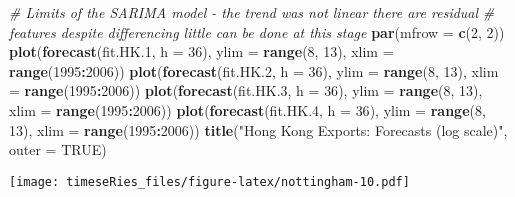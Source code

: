 \documentclass[]{book}
\newenvironment{Shaded}{\begin{snugshade}}{\end{snugshade}}
\newcommand{\CommentTok}[1]{\textcolor[rgb]{0.56,0.35,0.01}{\textit{#1}}}
\newcommand{\DataTypeTok}[1]{\textcolor[rgb]{0.13,0.29,0.53}{#1}}
\newcommand{\DecValTok}[1]{\textcolor[rgb]{0.00,0.00,0.81}{#1}}
\newcommand{\FloatTok}[1]{\textcolor[rgb]{0.00,0.00,0.81}{#1}}
\newcommand{\KeywordTok}[1]{\textcolor[rgb]{0.13,0.29,0.53}{\textbf{#1}}}
\newcommand{\NormalTok}[1]{#1}
\newcommand{\OperatorTok}[1]{\textcolor[rgb]{0.81,0.36,0.00}{\textbf{#1}}}
\newcommand{\OtherTok}[1]{\textcolor[rgb]{0.56,0.35,0.01}{#1}}
\newcommand{\StringTok}[1]{\textcolor[rgb]{0.31,0.60,0.02}{#1}}
\begin{document}
\begin{Shaded}
\begin{Highlighting}[]
\CommentTok{# Limits of the SARIMA model - the trend was not linear there are residual}
\CommentTok{# features despite differencing little can be done at this stage}
\KeywordTok{par}\NormalTok{(}\DataTypeTok{mfrow =} \KeywordTok{c}\NormalTok{(}\DecValTok{2}\NormalTok{, }\DecValTok{2}\NormalTok{))}
\KeywordTok{plot}\NormalTok{(}\KeywordTok{forecast}\NormalTok{(fit.HK}\FloatTok{.1}\NormalTok{, }\DataTypeTok{h =} \DecValTok{36}\NormalTok{), }\DataTypeTok{ylim =} \KeywordTok{range}\NormalTok{(}\DecValTok{8}\NormalTok{, }\DecValTok{13}\NormalTok{), }\DataTypeTok{xlim =} \KeywordTok{range}\NormalTok{(}\DecValTok{1995}\OperatorTok{:}\DecValTok{2006}\NormalTok{))}
\KeywordTok{plot}\NormalTok{(}\KeywordTok{forecast}\NormalTok{(fit.HK}\FloatTok{.2}\NormalTok{, }\DataTypeTok{h =} \DecValTok{36}\NormalTok{), }\DataTypeTok{ylim =} \KeywordTok{range}\NormalTok{(}\DecValTok{8}\NormalTok{, }\DecValTok{13}\NormalTok{), }\DataTypeTok{xlim =} \KeywordTok{range}\NormalTok{(}\DecValTok{1995}\OperatorTok{:}\DecValTok{2006}\NormalTok{))}
\KeywordTok{plot}\NormalTok{(}\KeywordTok{forecast}\NormalTok{(fit.HK}\FloatTok{.3}\NormalTok{, }\DataTypeTok{h =} \DecValTok{36}\NormalTok{), }\DataTypeTok{ylim =} \KeywordTok{range}\NormalTok{(}\DecValTok{8}\NormalTok{, }\DecValTok{13}\NormalTok{), }\DataTypeTok{xlim =} \KeywordTok{range}\NormalTok{(}\DecValTok{1995}\OperatorTok{:}\DecValTok{2006}\NormalTok{))}
\KeywordTok{plot}\NormalTok{(}\KeywordTok{forecast}\NormalTok{(fit.HK}\FloatTok{.4}\NormalTok{, }\DataTypeTok{h =} \DecValTok{36}\NormalTok{), }\DataTypeTok{ylim =} \KeywordTok{range}\NormalTok{(}\DecValTok{8}\NormalTok{, }\DecValTok{13}\NormalTok{), }\DataTypeTok{xlim =} \KeywordTok{range}\NormalTok{(}\DecValTok{1995}\OperatorTok{:}\DecValTok{2006}\NormalTok{))}
\KeywordTok{title}\NormalTok{(}\StringTok{"Hong Kong Exports: Forecasts (log scale)"}\NormalTok{, }\DataTypeTok{outer =} \OtherTok{TRUE}\NormalTok{)}
\end{Highlighting}
\end{Shaded}

\texttt{[image: timeseRies\_files/figure-latex/nottingham-10.pdf]}
\end{document}
